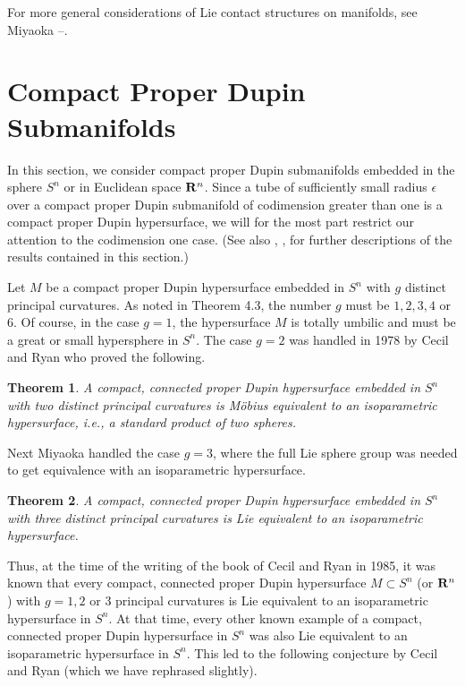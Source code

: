 \documentclass[12pt]{article}
\newtheorem{theorem}{Theorem}[section]
\begin{document}
{For more general considerations of Lie contact structures on manifolds, see Miyaoka \cite{Mi4}--\cite{Mi7}.


\section{Compact Proper Dupin Submanifolds}
\label{sec:compact-proper-dupin}

In this section, we consider compact proper Dupin
submanifolds embedded in the sphere $S^n$ or in Euclidean space ${\bf R}^n$.  Since a tube
of sufficiently small radius $\epsilon$ over a compact
proper Dupin submanifold of codimension greater than one is
a compact proper Dupin hypersurface, we will 
for the most part restrict our
attention to the codimension one case. (See also \cite{Cec-compact-dupin}, \cite{Cec-classifications-dupin},
\cite[pp. 308--322]{CR8} 
for further descriptions of the results contained in this section.)

Let $M$ be a compact
proper Dupin hypersurface embedded in $S^n$ with $g$ distinct
principal curvatures.  
As noted in Theorem 4.3, the number $g$
must be $1,2,3,4$ or 6.  Of course, in the case $g=1$, the
hypersurface $M$ is totally umbilic and must be a great or small
hypersphere in $S^n$.  The case $g=2$ was handled in 1978
by Cecil and Ryan \cite{CRMA} who proved the following.
\begin{theorem}
\label{thm:C-R-math-ann}
A compact, connected proper Dupin hypersurface embedded in $S^n$
with two distinct principal curvatures is M\"{o}bius equivalent to
an isoparametric hypersurface, i.e., a standard product of two spheres.
\end{theorem}
Next Miyaoka \cite{Mi1} handled the case $g=3$, where the full
Lie sphere group was needed to get equivalence with an
isoparametric hypersurface.
\begin{theorem}
\label{thm:miyaoka-1}
A compact, connected proper Dupin hypersurface embedded in $S^n$
with three distinct principal curvatures is Lie equivalent
to an isoparametric hypersurface.
\end{theorem}


Thus, at the time of the writing of the book \cite{CR7} of Cecil and Ryan in 1985, it was known that every compact, connected proper Dupin hypersurface 
$M \subset S^n$ (or ${\bf R}^n$) with
$g= 1,2$ or 3 principal curvatures is Lie equivalent to an isoparametric hypersurface in $S^n$.
At that time, every other known example
of a compact, connected proper Dupin hypersurface in $S^n$ 
was also Lie equivalent to an isoparametric hypersurface in $S^n$. 
This led to the following
conjecture by Cecil and Ryan \cite[p. 184]{CR7} (which we have rephrased slightly).

}
\end{document}

